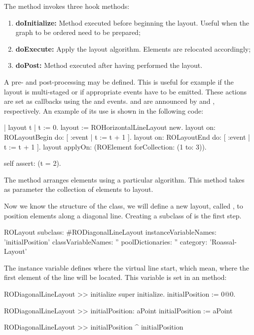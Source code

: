 \documentclass[a4paper,10pt,twoside]{book}
\begin{document}
The  method invokes three hook methods:

\begin{enumerate}
\item \textbf{doInitialize:} Method executed before beginning the layout. Useful when the graph to be ordered need to be prepared;
\item \textbf{doExecute:} Apply the layout algorithm. Elements are relocated accordingly;
\item \textbf{doPost:} Method executed after having performed the layout. 
\end{enumerate}

A pre- and post-processing may be defined. This is useful for example if the layout is multi-staged or if appropriate events have to be emitted. These actions are set as callbacks using the  and  events.
 and  are announced by  and , respectively. An example of its use is shown in the following code:

\begin{code}{}
| layout t |
t := 0.
layout := ROHorizontalLineLayout new.
layout on: ROLayoutBegin do: [ :event | t := t + 1 ].
layout on: ROLayoutEnd do: [ :event | t := t + 1 ].
layout applyOn: (ROElement forCollection: (1 to: 3)).

self assert: (t = 2).
\end{code}

The  method arranges elements using a particular algorithm. This method takes as parameter the collection of elements to layout.

Now we know the structure of the  class, we will define a new layout, called , to position elements along a diagonal line.
Creating a subclass of  is the first step. 

\begin{code}{}
ROLayout subclass: #RODiagonalLineLayout
	instanceVariableNames: 'initialPosition'
	classVariableNames: ''
	poolDictionaries: ''
	category: 'Roassal-Layout'
\end{code}

The instance variable  defines where the virtual line start, which mean, where the first element of the line will be located. This variable is set in an  method:

\begin{code}{}
RODiagonalLineLayout >> initialize
	super initialize.
	initialPosition := 0@0.
	
RODiagonalLineLayout >> initialPosition: aPoint
	initialPosition := aPoint
	
RODiagonalLineLayout >> initialPosition
	^ initialPosition
\end{code}
\end{document}
